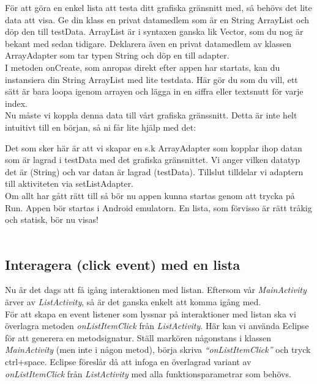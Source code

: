 \documentclass[11 pt, titlepage]{article} %
\begin{document}
För att göra en enkel lista att testa ditt grafiska gränsnitt med, så behövs det lite data att visa.
Ge din klass en privat datamedlem som är en String ArrayList och döp den till testData. ArrayList är i syntaxen ganska lik Vector, som du nog är bekant med sedan tidigare.
Deklarera även en privat datamedlem av klassen ArrayAdapter som tar typen String och döp en till adapter.\\


I metoden onCreate, som anropas direkt efter appen har startats, kan du instansiera din String ArrayList med lite testdata. Här gör du som du vill, ett sätt är bara loopa igenom arrayen och lägga in en siffra eller textsnutt för varje index.\\

Nu måste vi koppla denna data till vårt grafiska gränssnitt. Detta är inte helt intuitivt till en början, så ni får lite hjälp med det:

Det som sker här är att vi skapar en s.k ArrayAdapter som kopplar ihop datan som är lagrad i testData med det grafiska gränsnittet. Vi anger vilken datatyp det är (String) och var datan är lagrad (testData). Tillslut tilldelar vi adaptern till aktiviteten via setListAdapter.\\

Om allt har gått rätt till så bör nu appen kunna startas genom att trycka på Run. Appen bör startas i Android emulatorn. En lista, som förvisso är rätt tråkig och statisk, bör nu visas!\\ \\


\subsection{Interagera (click event) med en lista}
Nu är det dags att få igång interaktionen med listan. Eftersom vår \textit{MainActivity} ärver av \textit{ListActivity}, så är det ganska enkelt att komma igång med.\\

För att skapa en event listener som lyssnar på interaktioner med listan ska vi överlagra metoden \textit{onListItemClick} från \textit{ListActivity}. Här kan vi använda Eclipse för att generera en metodsignatur. Ställ markören någonstans i klassen \textit{MainActivity} (men inte i någon metod), börja skriva \textit{“onListItemClick”} och tryck ctrl+space. Eclipse föreslår då att infoga en överlagrad variant av \textit{onListItemClick} från \textit{ListActivity} med alla funktionsparametrar som behövs.\\
\end{document}
